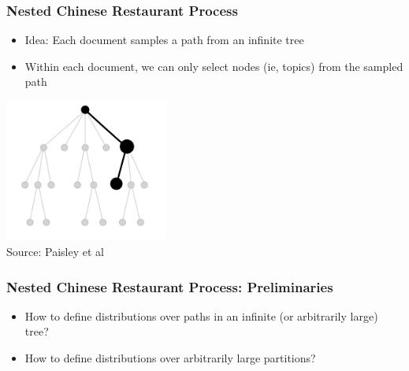 \begin{frame}
\frametitle{Nested Chinese Restaurant Process}
\begin{itemize}[<+->]
\item Idea: Each document samples a path from an infinite tree
\item Within each document, we can only select nodes (ie, topics) from the sampled path
\end{itemize}
\begin{center}
\includegraphics[width=0.4\textwidth]{../figures/ncrp.png} \\
{\tiny Source: Paisley et al \cite{paisley2015nhdp}}
\end{center}
\end{frame}

\begin{frame}
\frametitle{Nested Chinese Restaurant Process: Preliminaries}
\begin{itemize}[<+->]
\item How to define distributions over paths in an infinite (or arbitrarily large) tree? \\
\item How to define distributions over arbitrarily large partitions? \\
\end{itemize}
\end{frame}

